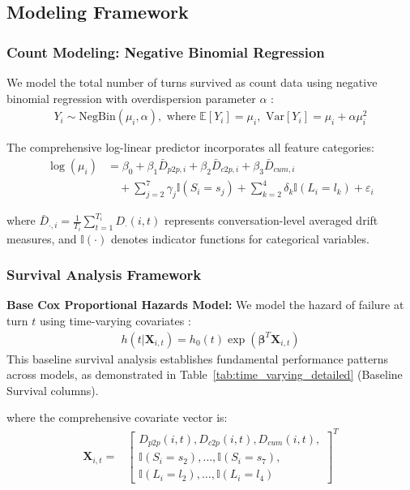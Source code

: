\documentclass[letterpaper]{article}
\begin{document}
\subsection{Modeling Framework}

\subsubsection{Count Modeling: Negative Binomial Regression}
We model the total number of turns survived as count data using negative binomial regression with overdispersion parameter $\alpha$ \cite{cameron2013regression,hilbe2011negative}:
\begin{align}
Y_i \sim \text{NegBin}(\mu_i, \alpha), \text{ where } \mathbb{E}[Y_i] = \mu_i, \text{ Var}[Y_i] = \mu_i + \alpha\mu_i^2 \label{eq:negbin}
\end{align}

The comprehensive log-linear predictor incorporates all feature categories:
{\small
\begin{align}
\log(\mu_i) &= \beta_0 + \beta_1 \bar{D}_{p2p,i} + \beta_2 \bar{D}_{c2p,i} + \beta_3 \bar{D}_{cum,i} \nonumber \\
&\quad + \sum_{j=2}^{7} \gamma_j \mathbb{I}(S_i = s_j) + \sum_{k=2}^{4} \delta_k \mathbb{I}(L_i = l_k) + \varepsilon_i \label{eq:negbin_full}
\end{align}
}

where $\bar{D}_{\cdot,i} = \frac{1}{T_i}\sum_{t=1}^{T_i} D_{\cdot}(i,t)$ represents conversation-level averaged drift measures, and $\mathbb{I}(\cdot)$ denotes indicator functions for categorical variables.

\subsubsection{Survival Analysis Framework}

\textbf{Base Cox Proportional Hazards Model:} We model the hazard of failure at turn $t$ using time-varying covariates \cite{cox1972regression,therneau2000modeling}:
\begin{align}
h(t|\mathbf{X}_{i,t}) = h_0(t) \exp\left(\boldsymbol{\beta}^T \mathbf{X}_{i,t}\right) \label{eq:cox_base}
\end{align}
This baseline survival analysis establishes fundamental performance patterns across models, as demonstrated in Table~\ref{tab:time_varying_detailed} (Baseline Survival columns).

where the comprehensive covariate vector is:
{\footnotesize
\begin{align}
\mathbf{X}_{i,t} = &\begin{bmatrix}
D_{p2p}(i,t), D_{c2p}(i,t), D_{cum}(i,t), \\
\mathbb{I}(S_i = s_2), \ldots, \mathbb{I}(S_i = s_7), \\
\mathbb{I}(L_i = l_2), \ldots, \mathbb{I}(L_i = l_4)
\end{bmatrix}^T \label{eq:covariate_vector}
\end{align}
}
\end{document}
